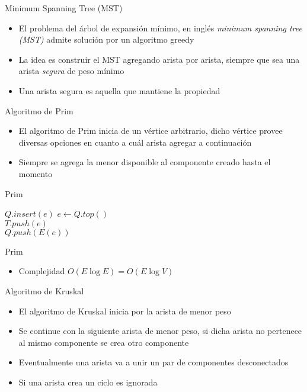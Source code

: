 \documentclass[]{beamer}
\begin{document}
\begin{frame}{Minimum Spanning Tree (MST)}
  \begin{itemize}
    \item El problema del \'arbol de expansi\'on m\'inimo, en ingl\'es \textit{minimum spanning tree (MST)} admite soluci\'on por un algoritmo greedy
      \pause
    \item La idea es construir el MST agregando arista por arista, siempre que sea una arista \textit{segura} de peso m\'inimo
      \pause
    \item Una arista segura es aquella que mantiene la propiedad
  \end{itemize}
\end{frame}

\begin{frame}{Algoritmo de Prim}
  \begin{itemize}
    \item El algoritmo de Prim inicia de un v\'ertice arbitrario, dicho v\'ertice provee diversas opciones en cuanto a cu\'al arista agregar a continuaci\'on
      \pause
    \item Siempre se agrega la menor disponible al componente creado hasta el momento
  \end{itemize}
\end{frame}

\begin{frame}{Prim}
  \begin{algorithm}[H]
    $ Q.insert(e) $ 
    {
      {$e \gets Q.top()$} \\
      {
        {$ T.push(e) $} \\
        {$Q.push(E(e))$}
      }
    }
  \end{algorithm}
\end{frame}

\begin{frame}{Prim}
  \begin{itemize}
    \item Complejidad $O(E \log E) = O(E \log V)$
  \end{itemize}
\end{frame}

\begin{frame}{Algoritmo de Kruskal}
  \begin{itemize}
    \item El algoritmo de Kruskal inicia por la arista de menor peso
      \pause
    \item Se continue con la siguiente arista de menor peso, si dicha arista no pertenece al mismo componente se crea otro componente
      \pause
    \item Eventualmente una arista va a unir un par de componentes desconectados
      \pause
    \item Si una arista crea un ciclo es ignorada
  \end{itemize}
\end{frame}
\end{document}
